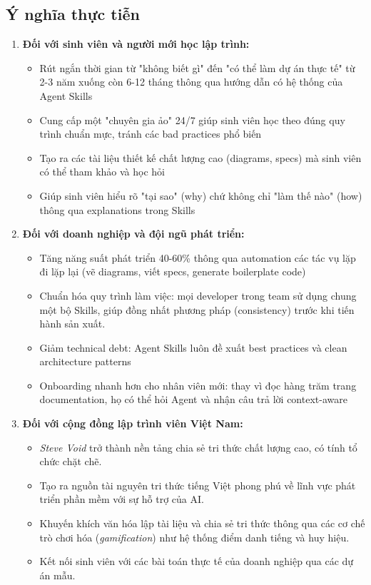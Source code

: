 \documentclass[13pt,a4paper,oneside]{extreport}
\numberwithin{equation}{chapter}
\numberwithin{figure}{chapter}
\numberwithin{table}{chapter}
\begin{document}
\subsection*{Ý nghĩa thực tiễn}

\begin{enumerate}
    \item \textbf{Đối với sinh viên và người mới học lập trình:}
    \begin{itemize}
        \item Rút ngắn thời gian từ "không biết gì" đến "có thể làm dự án thực tế" từ 2-3 năm xuống còn 6-12 tháng thông qua hướng dẫn có hệ thống của Agent Skills
        \item Cung cấp một "chuyên gia ảo" 24/7 giúp sinh viên học theo đúng quy trình chuẩn mực, tránh các bad practices phổ biến
        \item Tạo ra các tài liệu thiết kế chất lượng cao (diagrams, specs) mà sinh viên có thể tham khảo và học hỏi
        \item Giúp sinh viên hiểu rõ "tại sao" (why) chứ không chỉ "làm thế nào" (how) thông qua explanations trong Skills
    \end{itemize}

    \item \textbf{Đối với doanh nghiệp và đội ngũ phát triển:}
    \begin{itemize}
        \item Tăng năng suất phát triển 40-60\% thông qua automation các tác vụ lặp đi lặp lại (vẽ diagrams, viết specs, generate boilerplate code)
        \item Chuẩn hóa quy trình làm việc: mọi developer trong team sử dụng chung một bộ Skills, giúp đồng nhất phương pháp (consistency) trước khi tiến hành sản xuất.
        \item Giảm technical debt: Agent Skills luôn đề xuất best practices và clean architecture patterns
        \item Onboarding nhanh hơn cho nhân viên mới: thay vì đọc hàng trăm trang documentation, họ có thể hỏi Agent và nhận câu trả lời context-aware
    \end{itemize}

    \item \textbf{Đối với cộng đồng lập trình viên Việt Nam:}
    \begin{itemize}
        \item \textit{Steve Void} trở thành nền tảng chia sẻ tri thức chất lượng cao, có tính tổ chức chặt chẽ.
        \item Tạo ra nguồn tài nguyên tri thức tiếng Việt phong phú về lĩnh vực phát triển phần mềm với sự hỗ trợ của AI.
        \item Khuyến khích văn hóa lập tài liệu và chia sẻ tri thức thông qua các cơ chế trò chơi hóa (\textit{gamification}) như hệ thống điểm danh tiếng và huy hiệu.
        \item Kết nối sinh viên với các bài toán thực tế của doanh nghiệp qua các dự án mẫu.
    \end{itemize}


\end{enumerate}
\end{document}
